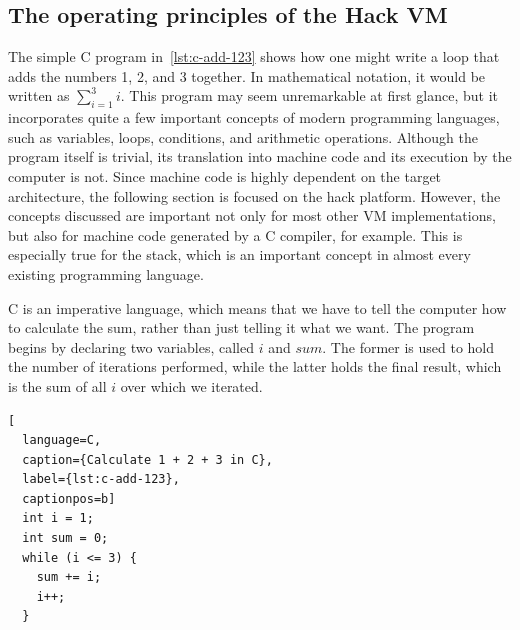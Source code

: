 
\subsection{The operating principles of the Hack VM}
The simple C program in~\cref{lst:c-add-123} shows how one might write a loop that adds the numbers 1, 2, and 3 together.
In mathematical notation, it would be written as \(\sum_{i=1}^{3}i\).
This program may seem unremarkable at first glance, but it incorporates quite a few important concepts of modern programming languages, such as variables, loops, conditions, and arithmetic operations.
Although the program itself is trivial, its translation into machine code and its execution by the computer is not.
Since machine code is highly dependent on the target architecture, the following section is focused on the hack platform. However, the concepts discussed are important not only for most other VM implementations, but also for machine code generated by a C compiler, for example.
This is especially true for the stack, which is an important concept in almost every existing programming language.

C is an imperative language, which means that we have to tell the computer how to calculate the sum, rather than just telling it what we want. The program begins by declaring two variables, called \(i\) and \(sum\). The former is used to hold the number of iterations performed, while the latter holds the final result, which is the sum of all \(i\) over which we iterated.

\begin{lstlisting}[
  language=C,
  caption={Calculate 1 + 2 + 3 in C},
  label={lst:c-add-123},
  captionpos=b]
  int i = 1;
  int sum = 0;
  while (i <= 3) {
    sum += i;
    i++;
  }
\end{lstlisting}

